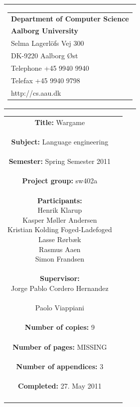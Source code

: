 \begin{nopagebreak}
\samepage 
\begin{tabular}{r}
\parbox{\textwidth}{
\hfill \parbox{6.2cm}{\begin{tabular}{l}
{\textsf\small \textbf{Department of Computer Science }}\\
{\textsf\small  \textbf{Aalborg University}}\\
{\textsf\small Selma Lagerlöfs Vej 300}\\
{\textsf\small DK-9220 Aalborg Øst}\\
{\textsf\small Telephone +45 9940 9940}\\
{\textsf\small Telefax +45 9940 9798}\\
{\textsf\small http://cs.aau.dk}
\end{tabular}}}
\end{tabular}

\begin{tabular}{cc}
\parbox{7cm}{
\textbf{Title:} 
Wargame\\ \\
\textbf{Subject:} 
Language engineering \\ \\
\textbf{Semester:} Spring Semester 2011\\ \\
\textbf{Project group:} sw402a\\ \\
\textbf{Participants:} \\
Henrik Klarup \\
Kasper Møller Andersen \\
Kristian Kolding Foged-Ladefoged \\
Lasse Rørbæk \\
Rasmus Aaen \\
Simon Frandsen \\ \\
\textbf{Supervisor:} \\
Jorge Pablo Cordero Hernandez \\ \\
Paolo Viappiani\\ \\
\textbf{Number of copies:}
 9 \\ \\
\textbf{Number of pages:}
MISSING \\ \\
\textbf{Number of appendices:}
 3 \\ \\
\textbf{Completed:}
27. May 2011 \\ \\
}


\end{tabular}
\end{nopagebreak}
